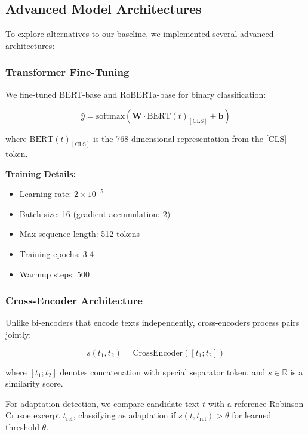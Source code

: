 \documentclass[12pt,a4paper]{article}
\begin{document}
\subsection{Advanced Model Architectures}

To explore alternatives to our baseline, we implemented several advanced architectures:

\subsubsection{Transformer Fine-Tuning}

We fine-tuned BERT-base \cite{Devlin2019} and RoBERTa-base \cite{Liu2019} for binary classification:

\begin{equation}
\hat{y} = \text{softmax}(\mathbf{W} \cdot \text{BERT}(t)_{[\text{CLS}]} + \mathbf{b})
\end{equation}

where $\text{BERT}(t)_{[\text{CLS}]}$ is the 768-dimensional representation from the [CLS] token.

\textbf{Training Details:}
\begin{itemize}
    \item Learning rate: $2 \times 10^{-5}$
    \item Batch size: 16 (gradient accumulation: 2)
    \item Max sequence length: 512 tokens
    \item Training epochs: 3-4
    \item Warmup steps: 500
\end{itemize}

\subsubsection{Cross-Encoder Architecture}

Unlike bi-encoders that encode texts independently, cross-encoders process pairs jointly:

\begin{equation}
s(t_1, t_2) = \text{CrossEncoder}([t_1; t_2])
\end{equation}

where $[t_1; t_2]$ denotes concatenation with special separator token, and $s \in \mathbb{R}$ is a similarity score.

For adaptation detection, we compare candidate text $t$ with a reference Robinson Crusoe excerpt $t_{\text{ref}}$, classifying as adaptation if $s(t, t_{\text{ref}}) > \theta$ for learned threshold $\theta$.
\end{document}
